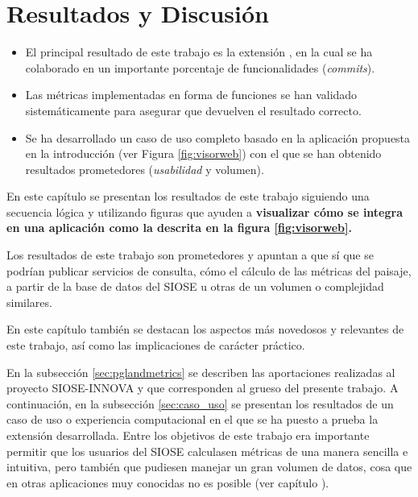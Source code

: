 \chapter{Resultados y Discusión}\label{chap:result}

\begin{graybox}
\begin{itemize}
\item El principal resultado de este trabajo es la extensión \pgland{}, en la cual se ha colaborado en un importante porcentaje de funcionalidades (\textit{commits}).
\item Las métricas implementadas en forma de funciones se han validado sistemáticamente para asegurar que devuelven el resultado correcto.
\item Se ha desarrollado un caso de uso completo basado en la aplicación propuesta en la introducción (ver Figura \ref{fig:visorweb}) con el que se han obtenido resultados prometedores (\textit{usabilidad} y volumen).
\end{itemize}
\end{graybox}


En este capítulo se presentan los resultados de este trabajo siguiendo una secuencia lógica y utilizando  figuras que ayuden a \textbf{visualizar cómo \pgland{} se integra en una aplicación como la descrita en la figura \ref{fig:visorweb}.}

Los resultados de este trabajo son prometedores y apuntan a que sí que se podrían publicar servicios de consulta, cómo el cálculo de las métricas del paisaje, a partir de la base de datos del SIOSE u otras de un volumen o complejidad similares.

En este capítulo también se destacan los  aspectos más novedosos y relevantes de este trabajo, así como las implicaciones de carácter práctico.

En la subsección \ref{sec:pglandmetrics} se describen las aportaciones realizadas al proyecto SIOSE-INNOVA y que corresponden al grueso del presente trabajo. A continuación, en la subsección \ref{sec:caso_uso} se presentan los resultados de un caso de uso o experiencia computacional en el que se ha puesto a prueba la extensión desarrollada. Entre los objetivos de este trabajo era importante permitir que los usuarios del SIOSE calculasen métricas de una manera sencilla e intuitiva, pero también que pudiesen manejar un gran volumen de datos, cosa que en otras aplicaciones muy conocidas no es posible (ver capítulo ).

